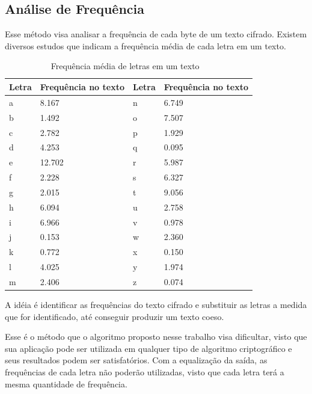 \subsection{Análise de Frequência}
\label{frequency-analysis}

Esse método visa analisar a frequência de cada byte de um texto cifrado. Existem diversos estudos que indicam a frequência média de cada letra em um texto. 

\begin{table}[h]
\centering
\begin{tabular}{|l|l|l|l|}
	\hline
	Letra & Frequência no texto & Letra & Frequência no texto \\ \hline
	a & 8.167 & n & 6.749 \\ \hline
	b & 1.492 & o & 7.507 \\ \hline
	c & 2.782 & p & 1.929 \\ \hline
	d & 4.253 & q & 0.095 \\ \hline
	e & 12.702 & r & 5.987 \\ \hline
	f & 2.228 & s & 6.327 \\ \hline
	g & 2.015 & t & 9.056 \\ \hline
	h & 6.094 & u & 2.758 \\ \hline
	i & 6.966 & v & 0.978 \\ \hline
	j & 0.153 & w & 2.360 \\ \hline
	k & 0.772 & x & 0.150 \\ \hline
	l & 4.025 & y & 1.974 \\ \hline
	m & 2.406 & z & 0.074 \\ \hline
\end{tabular}
\caption[{Frequência média de letras em um texto}]{Frequência média de letras em um texto ~\cite{robert-lewand}} 
\end{table}

A idéia é identificar as frequências do texto cifrado e substituir as letras a medida que for identificado, até conseguir produzir um texto coeso.

Esse é o método que o algoritmo proposto nesse trabalho visa dificultar, visto que sua aplicação pode ser utilizada em qualquer tipo de algoritmo criptográfico e seus resultados podem ser satisfatórios. Com a equalização da saída, as frequências de cada letra não poderão utilizadas, visto que cada letra terá a mesma quantidade de frequência.